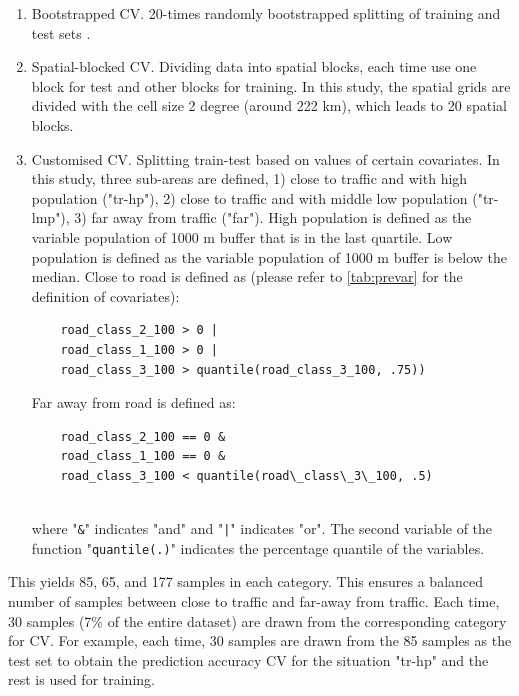 \documentclass{article}
\begin{document}
\begin{enumerate}
\item Bootstrapped CV. 20-times randomly bootstrapped splitting of training and test sets \citep{luglobal}.  

\item Spatial-blocked CV. Dividing data into spatial blocks, each time use one block for test and other blocks for training. In this study, the spatial grids are divided with the cell size 2 degree (around 222 km), which leads to 20 spatial blocks.
    
\item Customised CV. Splitting train-test based on values of certain covariates. In this study, three sub-areas are defined, 1) close to traffic and with high population ("tr-hp"), 2) close to traffic and with middle low population ("tr-lmp"), 3) far away from traffic ("far"). High population is defined as the variable population of 1000 m buffer that is in the last quartile. Low population is defined as the variable population of 1000 m buffer is below the median. Close to road is defined as (please refer to \cref{tab:prevar} for the definition of covariates): 
    \begin{lstlisting} 
    road_class_2_100 > 0 | 
    road_class_1_100 > 0 |
    road_class_3_100 > quantile(road_class_3_100, .75)) \end{lstlisting}
   
    Far away from road is defined as:
  \begin{lstlisting} 
    road_class_2_100 == 0 &
    road_class_1_100 == 0 & 
    road_class_3_100 < quantile(road\_class\_3\_100, .5)
    
    \end{lstlisting}
    where "{\tt \&}" indicates "and" and "{\tt |}" indicates "or". The second variable of the function "{\tt quantile(.)}" indicates the percentage quantile of the variables. 
   
\end{enumerate}
This yields 85, 65, and 177 samples in each category. This ensures a balanced number of samples between close to traffic and far-away from traffic. Each time, 30 samples (7\% of the entire dataset) are drawn from the corresponding category for CV. For example, each time, 30 samples are drawn from the 85 samples as the test set to obtain the prediction accuracy CV for the situation "tr-hp" and the rest is used for training.  
\end{document}
